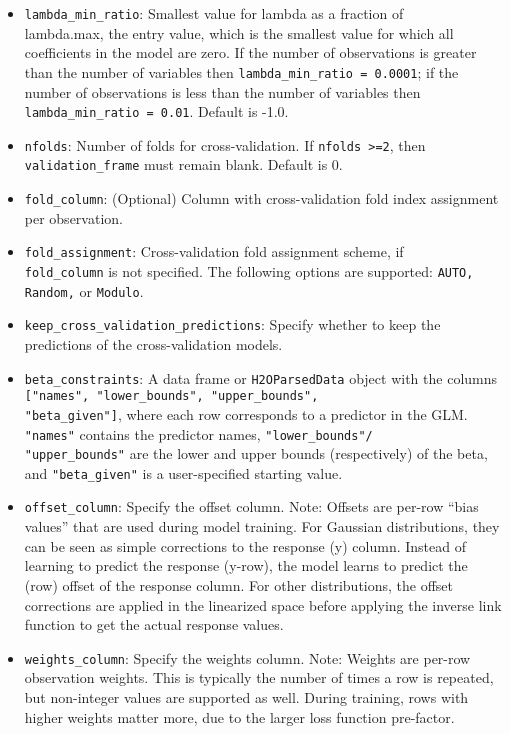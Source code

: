 \begin{itemize}
\item \texttt{lambda\_min\_ratio}: Smallest value for lambda as a fraction of \\ lambda.max, the entry value, which is the smallest value for which all coefficients in the model are zero. If the number of observations is greater than the number of variables then \texttt{lambda\_min\_ratio = 0.0001}; if the number of observations is less than the number of variables then \texttt{lambda\_min\_ratio = 0.01}. Default is -1.0.
\item \texttt{nfolds}: Number of folds for cross-validation. If \texttt{nfolds >=2}, then \texttt{validation\_frame} must remain blank. Default is 0. %
\item \texttt{fold\_column}: (Optional) Column with cross-validation fold index assignment per observation. 
\item \texttt{fold\_assignment}: Cross-validation fold assignment scheme, if \\ \texttt{fold\_column} is not specified. The following options are supported: \texttt{AUTO, Random,} or \texttt{Modulo}. 
\item \texttt{keep\_cross\_validation\_predictions}: Specify whether to keep the predictions of the cross-validation models. 
\item \texttt{beta\_constraints}: A data frame or \texttt{H2OParsedData} object with the columns \texttt{["names", "lower\_bounds", "upper\_bounds", \\ "beta\_given"]}, where each row corresponds to a predictor in the GLM. \texttt{"names"} contains the predictor names, \texttt{"lower\_bounds"/ \\ "upper\_bounds"} are the lower and upper bounds (respectively) of the beta, and  \texttt{"beta\_given"} is a user-specified starting value. 
\item \texttt{offset\_column}: Specify the offset column. Note: Offsets are per-row “bias values” that are used during model training. For Gaussian distributions, they can be seen as simple corrections to the response (y) column. Instead of learning to predict the response (y-row), the model learns to predict the (row) offset of the response column. For other distributions, the offset corrections are applied in the linearized space before applying the inverse link function to get the actual response values. 
\item \texttt{weights\_column}: Specify the weights column. Note: Weights are per-row observation weights. This is typically the number of times a row is repeated, but non-integer values are supported as well. During training, rows with higher weights matter more, due to the larger loss function pre-factor.

\end{itemize}
